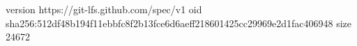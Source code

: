 version https://git-lfs.github.com/spec/v1
oid sha256:512df48b194f11ebbfc8f2b13fce6d6aeff218601425cc29969e2d1fac406948
size 24672
